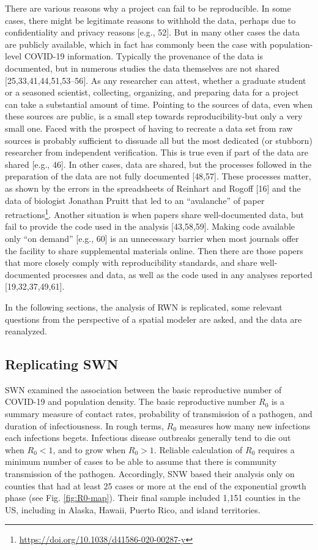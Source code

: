 \documentclass[10pt,letterpaper]{article}
\begin{document}
There are various reasons why a project can fail to be reproducible. In
some cases, there might be legitimate reasons to withhold the data,
perhaps due to confidentiality and privacy reasons {[}e.g., 52{]}. But
in many other cases the data are publicly available, which in fact has
commonly been the case with population-level COVID-19 information.
Typically the provenance of the data is documented, but in numerous
studies the data themselves are not shared {[}25,33,41,44,51,53--56{]}.
As any researcher can attest, whether a graduate student or a seasoned
scientist, collecting, organizing, and preparing data for a project can
take a substantial amount of time. Pointing to the sources of data, even
when these sources are public, is a small step towards
reproducibility-but only a very small one. Faced with the prospect of
having to recreate a data set from raw sources is probably sufficient to
dissuade all but the most dedicated (or stubborn) researcher from
independent verification. This is true even if part of the data are
shared {[}e.g., 46{]}. In other cases, data are shared, but the
processes followed in the preparation of the data are not fully
documented {[}48,57{]}. These processes matter, as shown by the errors
in the spreadsheets of Reinhart and Rogoff {[}16{]} and the data of
biologist Jonathan Pruitt that led to an ``avalanche'' of paper
retractions\footnote{\url{https://doi.org/10.1038/d41586-020-00287-y}}.
Another situation is when papers share well-documented data, but fail to
provide the code used in the analysis {[}43,58,59{]}. Making code
available only ``on demand'' {[}e.g., 60{]} is an unnecessary barrier
when most journals offer the facility to share supplemental materials
online. Then there are those papers that more closely comply with
reproducibility standards, and share well-documented processes and data,
as well as the code used in any analyses reported {[}19,32,37,49,61{]}.

In the following sections, the analysis of RWN is replicated, some
relevant questions from the perspective of a spatial modeler are asked,
and the data are reanalyzed.

\hypertarget{replicating-swn}{%
\subsection{Replicating SWN}\label{replicating-swn}}

SWN examined the association between the basic reproductive number of
COVID-19 and population density. The basic reproductive number \(R_0\)
is a summary measure of contact rates, probability of transmission of a
pathogen, and duration of infectiousness. In rough terms, \(R_0\)
measures how many new infections each infections begets. Infectious
disease outbreaks generally tend to die out when \(R_0<1\), and to grow
when \(R_0>1\). Reliable calculation of \(R_0\) requires a minimum
number of cases to be able to assume that there is community
transmission of the pathogen. Accordingly, SNW based their analysis only
on counties that had at least 25 cases or more at the end of the
exponential growth phase (see Fig. \ref{fig:R0-map}). Their final sample
included 1,151 counties in the US, including in Alaska, Hawaii, Puerto
Rico, and island territories.
\end{document}
